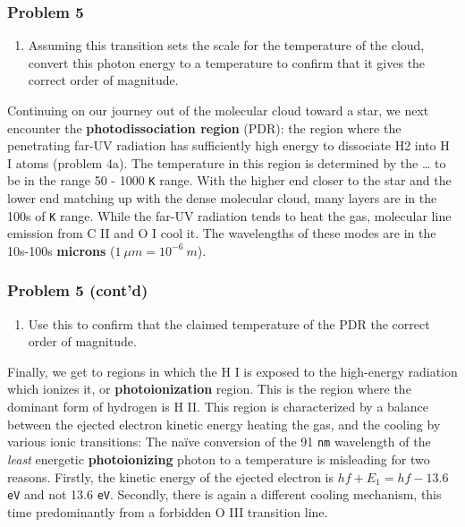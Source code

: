 \documentclass[11pt]{article}
\providecommand{\tightlist}{%
      \setlength{\itemsep}{0pt}\setlength{\parskip}{0pt}}
\begin{document}
 
\subsubsection{Problem 5}\label{problem-5}

\begin{enumerate}
\def\labelenumi{\alph{enumi}.}
\tightlist
\item
  Assuming this transition sets the scale for the temperature of the
  cloud, convert this photon energy to a temperature to confirm that it
  gives the correct order of magnitude.
\end{enumerate}
 

Continuing on our journey out of the molecular cloud toward a star, we
next encounter the \textbf{photodissociation region} (PDR): the region
where the penetrating far-UV radiation has sufficiently high energy to
dissociate H2 into H I atoms (problem 4a). The temperature in this
region is determined by the \ldots{} to be in the range 50 - 1000
\texttt{K} range. With the higher end closer to the star and the lower
end matching up with the dense molecular cloud, many layers are in the
100s of \texttt{K} range. While the far-UV radiation tends to heat the
gas, molecular line emission from C II and O I cool it. The wavelengths
of these modes are in the 10s-100s \textbf{microns}
(\(1\ \mu m = 10^{-6}\ m\)).

 
\subsubsection{Problem 5 (cont'd)}\label{problem-5-contd}

\begin{enumerate}
\def\labelenumi{\alph{enumi}.}
\setcounter{enumi}{1}
\tightlist
\item
  Use this to confirm that the claimed temperature of the PDR the
  correct order of magnitude.
\end{enumerate}
 

Finally, we get to regions in which the H I is exposed to the
high-energy radiation which ionizes it, or \textbf{photoionization}
region. This is the region where the dominant form of hydrogen is H II.
This region is characterized by a balance between the ejected electron
kinetic energy heating the gas, and the cooling by various ionic
transitions: The naïve conversion of the 91 \texttt{nm} wavelength of
the \emph{least} energetic \textbf{photoionizing} photon to a
temperature is misleading for two reasons. Firstly, the kinetic energy
of the ejected electron is \(hf+E_1=hf-13.6\) \texttt{eV} and not 13.6
\texttt{eV}. Secondly, there is again a different cooling mechanism,
this time predominantly from a forbidden O III transition line.
\end{document}
